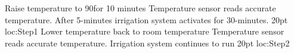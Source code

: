 {%
%
%
%
\tpStep%
{Raise temperature to 90\degree for 10 minutes}
{Temperature sensor reads accurate temperature. After 5-minutes irrigation system activates for 30-minutes.}
{20pt}
{loc:Step1}
%
\tpStepLabeled%
{Lower temperature back to room temperature}
{Temperature sensor reads accurate temperature. Irrigation system continues to run}
{20pt}
{loc:Step2}
%
%
%
%
}%


